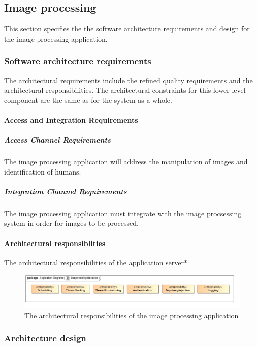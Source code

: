 \documentclass[a4paper,12pt]{report}
\begin{document}
	\subsection {Image processing}
	This section specifies the the software architecture requirements and design for the image processing application.
		\subsubsection {Software architecture requirements}
		The architectural requirements include the refined quality requirements and the architectural responsibilities. The architectural constraints for this lower level component are the same as for the system as a whole.
		
			\paragraph {Access and Integration Requirements}
				\subparagraph {Access Channel Requirements}
					The image processing application will address the manipulation of images and identification of humans.
				\subparagraph {Integration Channel Requirements}
					The  image processing application must integrate with the image procsessing system in order for images to be processed.	
			
			\FloatBarrier
			\paragraph {Architectural responsiblities}
				\hfill \break
				The architectural responsibilities of the 	application server*
				\begin{figure}[H]
					\centering
					\includegraphics  [scale=0.5]{../Diagrams/applicationServerResponsibiltiesZ.png}
					\caption{The architectural responsibilities of the image processing application}
				\end{figure}		
		
		\subsubsection {Architecture design}	
			\FloatBarrier	
\end{document}
